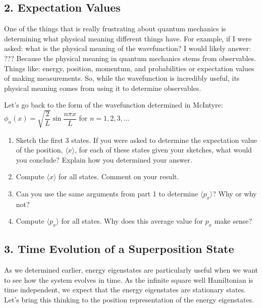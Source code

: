 \documentclass[
]{article}
\providecommand{\tightlist}{%
  \setlength{\itemsep}{0pt}\setlength{\parskip}{0pt}}
\providecommand{\tightlist}{%
  \setlength{\itemsep}{0pt}\setlength{\parskip}{0pt}}
\begin{document}
\hypertarget{expectation-values}{%
\subsection{2. Expectation Values}\label{expectation-values}}

One of the things that is really frustrating about quantum mechanics is
determining what physical meaning different things have. For example, if
I were asked: what is the physical meaning of the wavefunction? I would
likely answer: ??? Because the physical meaning in
quantum mechanics stems from observables. Things like: energy, position,
momentum, and probabilities or expectation values of making
measurements. So, while the wavefunction is incredibly useful, its
physical meaning comes from using it to determine observables.

Let's go back to the form of the wavefunction determined in McIntyre:
\(\phi_n(x) = \sqrt{\dfrac{2}{L}} \sin \dfrac{n\pi x}{L}\) for
\(n = 1,2,3,\dots\)

\begin{enumerate}
\def\labelenumi{\arabic{enumi}.}
\tightlist
\item
  Sketch the first 3 states. If you were asked to determine the
  expectation value of the position, \(\langle x \rangle\), for each of
  these states given your sketches, what would you conclude? Explain how
  you determined your answer.
\item
  Compute \(\langle x \rangle\) for all states. Comment on your result.
\item
  Can you use the same arguments from part 1 to determine
  \(\langle p_x \rangle\)? Why or why not?
\item
  Compute \(\langle p_x \rangle\) for all states. Why does this average
  value for \(p_x\) make sense?
\end{enumerate}

\hypertarget{time-evolution-of-a-superposition-state}{%
\subsection{3. Time Evolution of a Superposition
State}\label{time-evolution-of-a-superposition-state}}

As we determined earlier, energy eigenstates are particularly useful
when we want to see how the system evolves in time. As the infinite
square well Hamiltonian is time independent, we expect that the energy
eigenstates are stationary states. Let's bring this thinking to the
position representation of the energy eigenstates.
\end{document}
